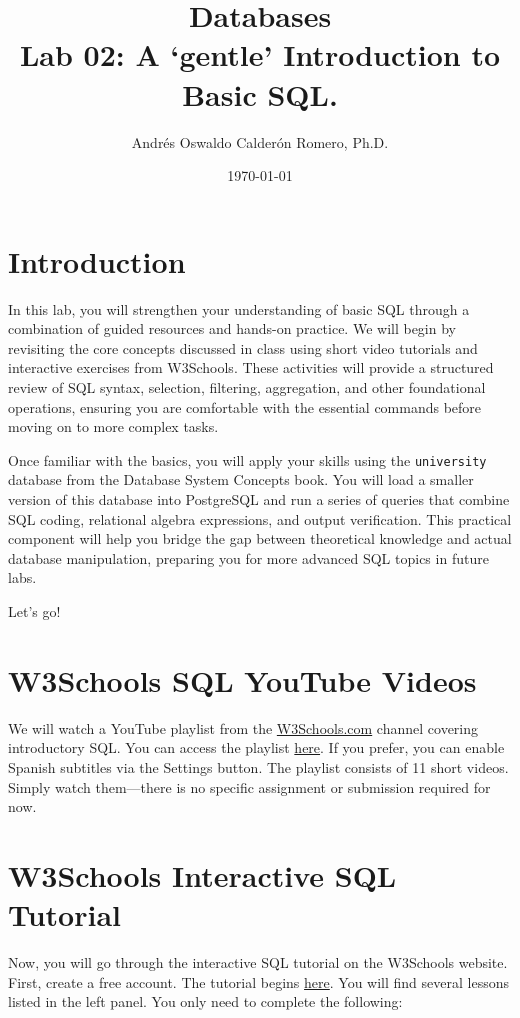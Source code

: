\documentclass{article}
\title{Databases \\ Lab 02: A `gentle' Introduction to Basic SQL.}
\author{Andrés Oswaldo Calderón Romero, Ph.D.}
\date{\today}
\begin{document}
\maketitle

\section{Introduction}
In this lab, you will strengthen your understanding of basic SQL through a combination of guided resources and hands-on practice. We will begin by revisiting the core concepts discussed in class using short video tutorials and interactive exercises from W3Schools. These activities will provide a structured review of SQL syntax, selection, filtering, aggregation, and other foundational operations, ensuring you are comfortable with the essential commands before moving on to more complex tasks.

Once familiar with the basics, you will apply your skills using the \texttt{university} database from the Database System Concepts book. You will load a smaller version of this database into PostgreSQL and run a series of queries that combine SQL coding, relational algebra expressions, and output verification. This practical component will help you bridge the gap between theoretical knowledge and actual database manipulation, preparing you for more advanced SQL topics in future labs.

Let's go!

\section{W3Schools SQL YouTube Videos}
We will watch a YouTube playlist from the \href{https://www.youtube.com/@w3schools}{W3Schools.com} channel covering introductory SQL. You can access the playlist \href{https://youtube.com/playlist?list=PLP9IO4UYNF0UQkBXlTMSw0CYsxv-GDkkI&si=qel9VClPHmerhGlz}{here}. If you prefer, you can enable Spanish subtitles via the Settings button. The playlist consists of 11 short videos. Simply watch them—there is no specific assignment or submission required for now.

\section{W3Schools Interactive SQL Tutorial}
Now, you will go through the interactive SQL tutorial on the W3Schools website. First, create a free account. The tutorial begins \href{https://www.w3schools.com/sql/}{here}. You will find several lessons listed in the left panel. You only need to complete the following:
\end{document}
